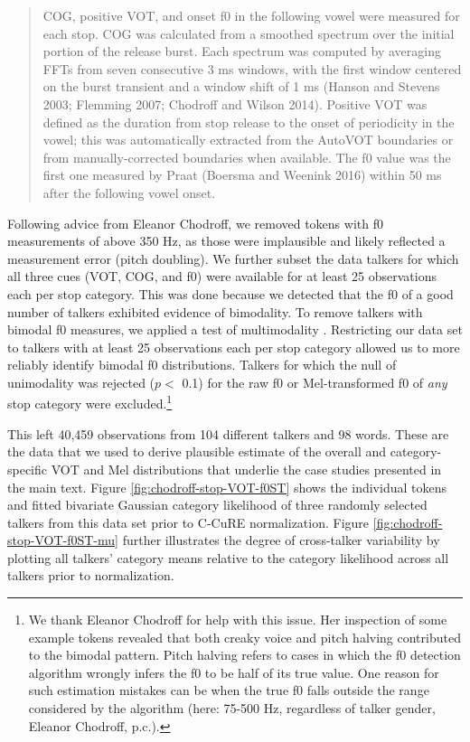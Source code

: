 \documentclass[
  11pt,
  man,floatsintext]{apa6}
\begin{document}
\begin{quote}
COG, positive VOT, and onset f0 in the following vowel were measured for each stop. COG was calculated
from a smoothed spectrum over the initial portion of the release burst. Each spectrum was computed by averaging
FFTs from seven consecutive 3 ms windows, with the first window centered on the burst transient and
a window shift of 1 ms (Hanson and Stevens 2003; Flemming 2007; Chodroff and Wilson 2014). Positive VOT
was defined as the duration from stop release to the onset of periodicity in the vowel; this was automatically
extracted from the AutoVOT boundaries or from manually-corrected boundaries when available. The
f0 value was the first one measured by Praat (Boersma and Weenink 2016) within 50 ms after the following
vowel onset.
\end{quote}

Following advice from Eleanor Chodroff, we removed tokens with f0 measurements of above 350 Hz, as those were implausible and likely reflected a measurement error (pitch doubling). We further subset the data talkers for which all three cues (VOT, COG, and f0) were available for at least 25 observations each per stop category. This was done because we detected that the f0 of a good number of talkers exhibited evidence of bimodality. To remove talkers with bimodal f0 measures, we applied a test of multimodality \autocite[the dip test, as implemented in the library \texttt{diptest} in \texttt{R},][]{R-diptest}. Restricting our data set to talkers with at least 25 observations each per stop category allowed us to more reliably identify bimodal f0 distributions. Talkers for which the null of unimodality was rejected (\(p<\) 0.1) for the raw f0 or Mel-transformed f0 of \emph{any} stop category were excluded.\footnote{We thank Eleanor Chodroff for help with this issue. Her inspection of some example tokens revealed that both creaky voice and pitch halving contributed to the bimodal pattern. Pitch halving refers to cases in which the f0 detection algorithm wrongly infers the f0 to be half of its true value. One reason for such estimation mistakes can be when the true f0 falls outside the range considered by the algorithm (here: 75-500 Hz, regardless of talker gender, Eleanor Chodroff, p.c.).}

This left 40,459 observations from 104 different talkers and 98 words. These are the data that we used to derive plausible estimate of the overall and category-specific VOT and Mel distributions that underlie the case studies presented in the main text. Figure \ref{fig:chodroff-stop-VOT-f0ST} shows the individual tokens and fitted bivariate Gaussian category likelihood of three randomly selected talkers from this data set prior to C-CuRE normalization. Figure \ref{fig:chodroff-stop-VOT-f0ST-mu} further illustrates the degree of cross-talker variability by plotting all talkers' category means relative to the category likelihood across all talkers prior to normalization.
\end{document}
